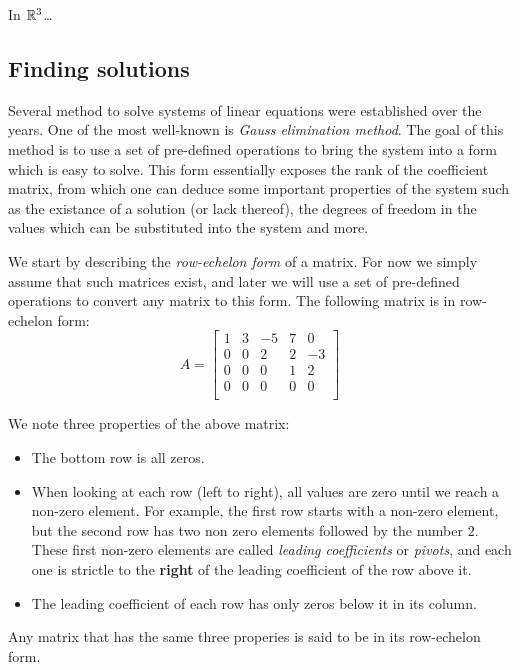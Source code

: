 In $\Rs[3]$\ldots
{}

\subsection{Finding solutions}
Several method to solve systems of linear equations were established over the years. One of the most well-known is \emph{Gauss elimination method}. The goal of this method is to use a set of pre-defined operations to bring the system into a form which is easy to solve. This form essentially exposes the rank of the coefficient matrix, from which one can deduce some important properties of the system such as the existance of a solution (or lack thereof), the degrees of freedom in the values which can be substituted into the system and more.

We start by describing the \emph{row-echelon form} of a matrix. For now we simply assume that such matrices exist, and later we will use a set of pre-defined operations to convert any matrix to this form. The following matrix is in row-echelon form:
\[
	A =
	\begin{bmatrix}
		1 & 3 & -5 & 7 &  0\\
		0 & 0 &  2 & 2 & -3\\
		0 & 0 &  0 & 1 &  2\\
		0 & 0 &  0 & 0 &  0\\
	\end{bmatrix} 
\]

We note three properties of the above matrix:
\begin{itemize}
	\item The bottom row is all zeros.
	\item When looking at each row (left to right), all values are zero until we reach a non-zero element. For example, the first row starts with a non-zero element, but the second row has two non zero elements followed by the number $2$. These first non-zero elements are called \emph{leading coefficients} or \emph{pivots}, and each one is strictle to the \textbf{right} of the leading coefficient of the row above it.
	\item The leading coefficient of each row has only zeros below it in its column.
\end{itemize}
Any matrix that has the same three properies is said to be in its row-echelon form.

